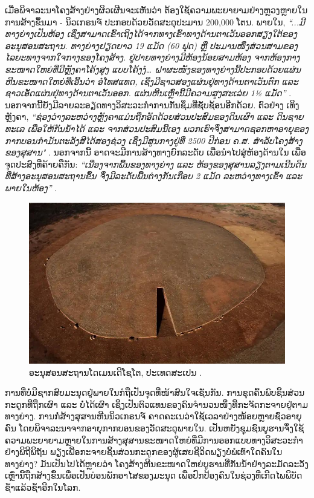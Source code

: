 \documentclass[10pt,twocolumn,letterpaper]{article}
\begin{document}
ເມື່ອພິຈາລະນາໂຄງສ້າງຢ່າງຜິວເຜີນຈະເຫັນວ່າ ຕ້ອງໃຊ້ຄວາມພະຍາຍາມຢ່າງຫຼວງຫຼາຍໃນການສ້າງຂຶ້ນມາ - ນິວເກຣນຈ໌ ປະກອບດ້ວຍວັດສະດຸປະມານ 200,000 ໂຕນ. ພາຍໃນ, \textit{“...ມີທາງຍ່າງເປັນຫ້ອງ ເຊິ່ງສາມາດເຂົ້າເຖິງໄດ້ຈາກທາງເຂົ້າທາງດ້ານຕາເວັນອອກສຽງໃຕ້ຂອງອະນຸສອນສະຖານ. ທາງຍ່າງຢຽດຍາວ 19 ແມັດ (60 ຟຸດ) ຫຼື ປະມານໜຶ່ງສ່ວນສາມຂອງໄລຍະທາງຈາກໃຈກາງຂອງໂຄງສ້າງ. ຢູ່ປາຍທາງຍ່າງມີຫ້ອງນ້ອຍສາມຫ້ອງ ຈາກຫ້ອງກາງຂະໜາດໃຫຍ່ທີ່ມີຫຼັງຄາໂຄ້ງສູງ ແບບໂຄ້ງງໍ… ຝາຜະໜັງຂອງທາງຍ່າງນີ້ປະກອບດ້ວຍແຜ່ນຫີນຂະໜາດໃຫຍ່ທີ່ເອີ້ນວ່າ ອໍໂທສແທດ, ເຊິ່ງມີຊາວສອງແຜ່ນຢູ່ທາງດ້ານຕາເວັນຕົກ ແລະ ຊາວເອັດແຜ່ນຢຸ່ທາງດ້ານຕາເວັນອອກ. ແຜ່ນຫີນເຫຼົ່ານີ້ມີຄວາມສູງສະເລ່ຍ 1½ ແມັດ”} \cite{70}. ນອກຈາກນີ້ຍັງມີລາຍລະອຽດທາງວິສະວະກຳການກັນຊຶມທີ່ຊັບຊ້ອນອີກດ້ວຍ. ຕົວຢ່າງ ເທິງຫຼັງຄາ, \textit{“ຊ່ອງວ່າງລະຫວ່າງຫຼັງຄາແມ່ນຖືກອັດດ້ວຍສ່ວນປະສົມຂອງດິນເຜົາ ແລະ ດິນຊາຍທະເລ ເພື່ອໃຫ້ກັນນ້ຳໄດ້ ແລະ ຈາກສ່ວນປະສົມນີ້ເອງ ພວກເຮົາຈຶ່ງສາມາດຊອກຫາອາຍຸຂອງກາກບອນກຳມັນຕະລັງສີໄດ້ສອງຊ່ວງ ເຊິ່ງມີສູນກາງຢູ່ທີ່ 2500 ປີກ່ອນ ຄ.ສ. ສຳລັບໂຄງສ້າງຂອງສຸສານ"} \cite{71}. ນອກຈາກນີ້ ອາດຈະມີການສ້າງທາງຍົກລະດັບ ເພື່ອນຳໄປສູ່ຫ້ອງດ້ານໃນ ເພື່ອຈຸດປະສົງທີ່ຄ້າຍຄືກັນ: \textit{“ເນື່ອງຈາກພື້ນຂອງທາງຍ່າງ ແລະ ຫ້ອງຂອງສຸສານລຽງຕາມເນີນດິນທີ່ສ້າງອະນຸສອນສະຖານຂຶ້ນ ຈຶ່ງມີລະດັບພື້ນຕ່າງກັນເກືອບ 2 ແມັດ ລະຫວ່າງທາງເຂົ້າ ແລະ ພາຍໃນຫ້ອງ”} \cite{71}.

\begin{figure}[b]
\begin{center}
   \includegraphics[width=1\linewidth]{dolmen.jpg}
\end{center}
   \caption{ອະນຸສອນສະຖານໂດເມນເດີໂຊໂຕ, ປະເທດສະເປນ \cite{53}.}
\label{fig:9}
\label{fig:onecol}
\end{figure}

ການທີ່ບໍ່ມີຊາກສົບມະນຸດຢູ່ພາຍໃນກໍຖືເປັນຈຸດທີ່ໜ້າສົນໃຈເຊັ່ນກັນ. ການຂຸດຄົ້ນພົບຊິ້ນສ່ວນກະດູກທີ່ຖືກເຜົາ ແລະ ບໍ່ໄດ້ເຜົາ ເຊິ່ງເປັນຕົວແທນຂອງຄົນຈຳນວນໜຶ່ງທີ່ກະຈັດກະຈາຍຢູ່ຕາມທາງຍ່າງ. ການກໍ່ສ້າງສຸສານຫີນນິວເກຣນຈ໌ ຄາດຄະເນວ່າໃຊ້ເວລາຢ່າງໜ້ອຍຫຼາຍຊົ່ວອາຍຸຄົນ ໂດຍພິຈາລະນາຈາກອາຍຸກາກບອນຂອງວັດສະດຸພາຍໃນ. ເປັນຫຍັງຊຸມຊົນບູຮານຈຶ່ງໃຊ້ຄວາມພະຍາຍາມຫຼາຍໃນການສ້າງສຸສານຂະໜາດໃຫຍ່ທີ່ມີການອອກແບບທາງວິສະວະກຳຢ່າງພິຖີພິຖັນ ພຽງເພື່ອກະຈາຍຊິ້ນສ່ວນກະດູກຂອງຜູ້ເສຍຊີວິດພຽງບໍ່ພໍເທົ່າໃດຄົນໃນທາງຍ່າງ? ມັນເປັນໄປໄດ້ຫຼາຍວ່າ ໂຄງສ້າງຫີນຂະໜາດໃຫຍ່ບູຮານທີ່ກັນນ້ຳຢ່າງລະມັດລະວັງເຫຼົ່ານີ້ຖືກສ້າງຂຶ້ນເພື່ອເປັນບ່ອນພັກອາໄສຂອງມະນຸດ ເພື່ອປົກປ້ອງຄົນໃນຊ່ວງທີ່ເກີດໄພພິບັດຊ້ຳແລ້ວຊ້ຳອີກໃນໂລກ.
\end{document}
